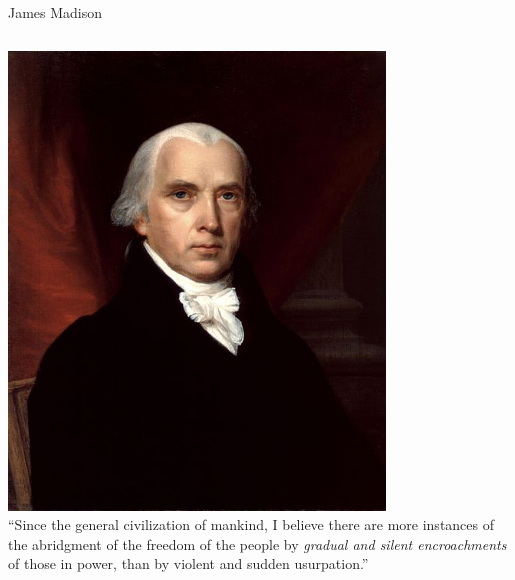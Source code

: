 \begin{frame}{James Madison}
    \begin{columns}[onlytextwidth]
            \centering
            \includegraphics[width=0.75\textwidth]{img/madison.jpg} \\
            ``Since the general civilization of mankind, I believe there are
            more instances of the abridgment of the freedom of the people by
            \emph{gradual and silent encroachments} of those in power, than by
            violent and sudden usurpation.''
    \end{columns}
\end{frame}

